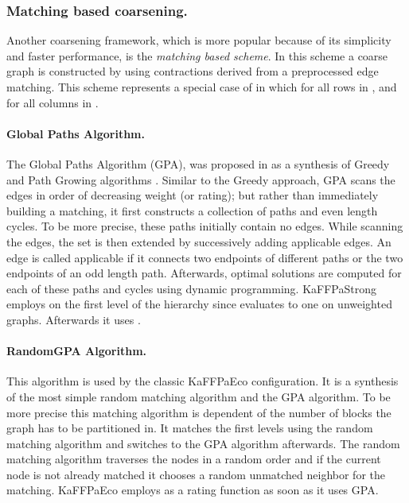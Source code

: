 \documentclass{llncs}
\begin{document}
\subsubsection{Matching based coarsening.}
\par Another coarsening framework, which is more popular because of its simplicity and faster performance, is the \emph{matching based scheme}. 
 In this scheme a coarse graph is constructed by using contractions derived from a preprocessed edge matching. This scheme represents a special case of  in which  for all rows  in , and  for all columns  in .
\paragraph{Global Paths Algorithm.}
The Global Paths Algorithm (GPA), was proposed in \cite{MauSan07} as a synthesis of Greedy and Path Growing algorithms \cite{DH03a}. 
Similar to the Greedy approach, GPA scans the edges in order of decreasing weight (or rating); 
but rather than immediately building a matching, it first constructs a collection
of paths and even length cycles. To be more precise, these paths initially contain no edges. 
While scanning the edges, 
the set is then extended by successively adding applicable edges. An edge is called applicable if it connects two endpoints of different paths or the two endpoints of an odd length path. Afterwards, optimal solutions are computed for each of these paths and cycles using dynamic programming. 
KaFFPaStrong \cite{kaffpa} employs  on the first level of the hierarchy since  evaluates to one on unweighted graphs. Afterwards it uses . 
\paragraph{RandomGPA Algorithm.}
This algorithm is used by the classic KaFFPaEco configuration. 
It is a synthesis of the most simple random matching algorithm and the GPA algorithm. 
To be more precise this matching algorithm is dependent of the number of blocks the graph has to be partitioned in. 
It matches the first  levels using the random matching algorithm and switches to the GPA algorithm afterwards. 
The random matching algorithm traverses the nodes in a random order and if the current node is not already matched it chooses a random unmatched neighbor for the matching.
KaFFPaEco employs  as a rating function as soon as it uses GPA.
\end{document}
